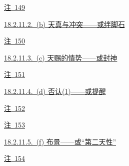 \par\noindent\hspace*{4.05em}\hyperref[ch18:local:n57]{注~149}\nobreak\dotfill\nobreak\hyperref[ch18:local:n57]{\pageref*{ch18:local:n57}}\par
\par\noindent\hspace*{2.70em}\hyperref[ch18:local:h64]{18.2.11.2.~(b) 天真与冲突——或绊脚石}\nobreak\dotfill\nobreak\hyperref[ch18:local:h64]{\pageref*{ch18:local:h64}}\par
\par\noindent\hspace*{4.05em}\hyperref[ch18:local:n58]{注~150}\nobreak\dotfill\nobreak\hyperref[ch18:local:n58]{\pageref*{ch18:local:n58}}\par
\par\noindent\hspace*{2.70em}\hyperref[ch18:local:h65]{18.2.11.3.~(c) 天赐的情势——或封神}\nobreak\dotfill\nobreak\hyperref[ch18:local:h65]{\pageref*{ch18:local:h65}}\par
\par\noindent\hspace*{4.05em}\hyperref[ch18:local:n59]{注~151}\nobreak\dotfill\nobreak\hyperref[ch18:local:n59]{\pageref*{ch18:local:n59}}\par
\par\noindent\hspace*{2.70em}\hyperref[ch18:local:h66]{18.2.11.4.~(d) 否认(1)——或提醒}\nobreak\dotfill\nobreak\hyperref[ch18:local:h66]{\pageref*{ch18:local:h66}}\par
\par\noindent\hspace*{4.05em}\hyperref[ch18:local:n60]{注~152}\nobreak\dotfill\nobreak\hyperref[ch18:local:n60]{\pageref*{ch18:local:n60}}\par
\par\noindent\hspace*{4.05em}\hyperref[ch18:local:n61]{注~153}\nobreak\dotfill\nobreak\hyperref[ch18:local:n61]{\pageref*{ch18:local:n61}}\par
\par\noindent\hspace*{2.70em}\hyperref[ch18:local:h67]{18.2.11.5.~(f) 布景——或“第二天性”}\nobreak\dotfill\nobreak\hyperref[ch18:local:h67]{\pageref*{ch18:local:h67}}\par
\par\noindent\hspace*{4.05em}\hyperref[ch18:local:n62]{注~154}\nobreak\dotfill\nobreak\hyperref[ch18:local:n62]{\pageref*{ch18:local:n62}}\par
